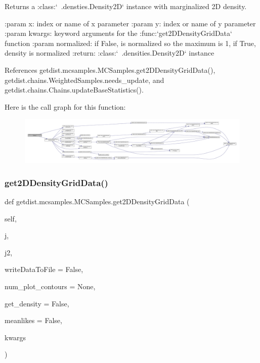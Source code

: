 \begin{DoxyVerb}Returns a :class:`~.densties.Density2D` instance with marginalized 2D density.

:param x: index or name of x parameter
:param y: index or name of y parameter
:param kwargs: keyword arguments for the :func:`get2DDensityGridData` function
:param normalized: if False, is normalized so the maximum is 1, if True, density is normalized
:return: :class:`~.densities.Density2D` instance
\end{DoxyVerb}
 

References getdist.\+mcsamples.\+M\+C\+Samples.\+get2\+D\+Density\+Grid\+Data(), getdist.\+chains.\+Weighted\+Samples.\+needs\+\_\+update, and getdist.\+chains.\+Chains.\+update\+Base\+Statistics().

Here is the call graph for this function\+:
\nopagebreak
\begin{figure}[H]
\begin{center}
\leavevmode
\includegraphics[width=350pt]{classgetdist_1_1mcsamples_1_1MCSamples_a0987c9312d821d6916322667f208ebcf_cgraph}
\end{center}
\end{figure}
\mbox{\label{classgetdist_1_1mcsamples_1_1MCSamples_a591064d13448b148006ce8246ad4446f}} 
\subsubsection{\texorpdfstring{get2\+D\+Density\+Grid\+Data()}{get2DDensityGridData()}}
{\footnotesize\ttfamily def getdist.\+mcsamples.\+M\+C\+Samples.\+get2\+D\+Density\+Grid\+Data (\begin{DoxyParamCaption}\item[{}]{self,  }\item[{}]{j,  }\item[{}]{j2,  }\item[{}]{write\+Data\+To\+File = {\ttfamily False},  }\item[{}]{num\+\_\+plot\+\_\+contours = {\ttfamily None},  }\item[{}]{get\+\_\+density = {\ttfamily False},  }\item[{}]{meanlikes = {\ttfamily False},  }\item[{}]{kwargs }\end{DoxyParamCaption})}

